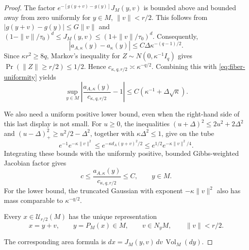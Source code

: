 \documentclass{article}
\newcommand{\Vol}{\operatorname{Vol}}
\numberwithin{equation}{section}
\newcommand{\Ucal}{\mathcal{U}}
\begin{document}
\begin{proof}
The factor $e^{-[g(y+v)-g(y)]}J_M(y,v)$ is bounded above and bounded
away from zero uniformly for $y\in M$, $\|v\|<r/2$.
This follows from $|g(y+v)-g(y)|\le G\|v\|$ and
$(1-\|v\|/\tau_0)^d\le J_M(y,v)\le(1+\|v\|/\tau_0)^d$.
Consequently,
\[
 |a_{A,\kappa}(y)-a_\kappa(y)|
 \le C\Delta\kappa^{-(q-1)/2}.
\]
Since $\kappa r^2\ge8q$,
Markov's inequality for $Z\sim N(0,\kappa^{-1}I_q)$ gives
$\Pr(\|Z\|\ge r/2)\le1/2$. Hence
$c_{\kappa,q,r/2}\asymp\kappa^{-q/2}$.
Combining this with \eqref{eq:fiber-uniformity} yields
\begin{equation}
 \sup_{y\in M}
 \left|\frac{a_{A,\kappa}(y)}{c_{\kappa,q,r/2}}-1\right|
 \le C\left(\kappa^{-1}+\Delta\sqrt\kappa\right).
\label{eq:estimated-fiber-uniformity}
\end{equation}

We also need a uniform positive lower bound, even when the right-hand
side of this last display is not small.
For $u\ge0$, the inequalities
$(u+\Delta)^2\le2u^2+2\Delta^2$ and
$(u-\Delta)_+^2\ge u^2/2-\Delta^2$, together with
$\kappa\Delta^2\le1$, give on the tube
\[
 e^{-1}e^{-\kappa\|v\|^2}
 \le e^{-\kappa d_A(y+v)^2/2}
 \le e^{1/2}e^{-\kappa\|v\|^2/4}.
\]
Integrating these bounds with the uniformly positive, bounded
Gibbs-weighted Jacobian factor gives
\begin{equation}
 c\le\frac{a_{A,\kappa}(y)}{c_{\kappa,q,r/2}}\le C,
 \qquad y\in M.
\label{eq:estimated-fiber-positive}
\end{equation}
For the lower bound, the truncated Gaussian with exponent
$-\kappa\|v\|^2$ also has mass comparable to $\kappa^{-q/2}$.


Every $x\in\Ucal_{r/2}(M)$ has the unique
representation
\[
  x=y+v,
  \qquad y=P_M(x)\in M,
  \qquad v\in N_yM,
  \qquad \lVert v\rVert<r/2.
\]
{\color{black}
The corresponding area formula is
$dx=J_M(y,v)\,dv\,\Vol_M(dy)$.

}
\end{proof}
\end{document}
